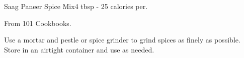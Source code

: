\begin{recipe}{Saag Paneer Spice Mix}{4 tbsp - 25 calories per.}{}

    \freeform From 101 Cookbooks.


    Use a mortar and pestle or spice grinder to grind spices as finely as possible. Store in an airtight container and use as needed.

\end{recipe}